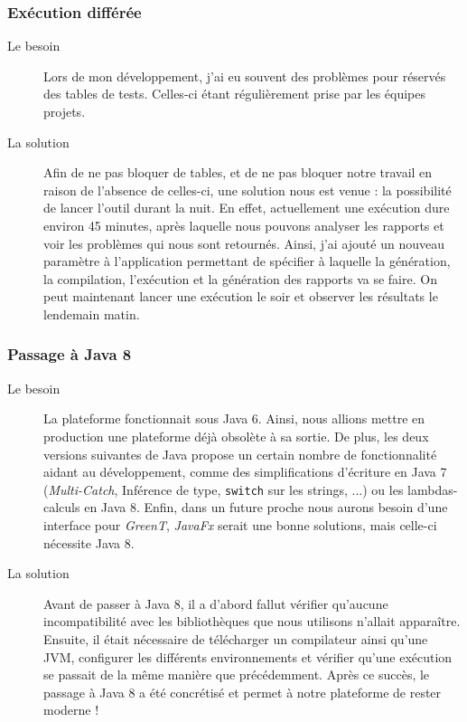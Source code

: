 	\subsubsection{Exécution différée} %
	\begin{description}
		\item[Le besoin] Lors de mon développement, j'ai eu souvent des problèmes pour réservés des tables de tests. Celles-ci étant régulièrement prise par les équipes projets. 
		\item[La solution] Afin de ne pas bloquer de tables, et de ne pas bloquer notre travail en raison de l'absence de celles-ci, une solution nous est venue : la possibilité de lancer l'outil durant la nuit. En effet, actuellement une exécution dure environ 45 minutes, après laquelle nous pouvons analyser les rapports et voir les problèmes qui nous sont retournés. Ainsi, j'ai ajouté un nouveau paramètre à l'application permettant de spécifier à laquelle la génération, la compilation, l'exécution et la génération des rapports va se faire. On peut maintenant lancer une exécution le soir et observer les résultats le lendemain matin.
	\end{description}
	
	\subsubsection{Passage à Java 8}
		\begin{description}
			\item[Le besoin] La plateforme fonctionnait sous Java 6. Ainsi, nous allions mettre en production une plateforme déjà obsolète à sa sortie. De plus, les deux versions suivantes de Java propose un certain nombre de fonctionnalité aidant au développement, comme des simplifications d'écriture en Java 7 (\textit{Multi-Catch}, Inférence de type, \texttt{switch} sur les strings, ...) ou les lambdas-calculs en Java 8. Enfin, dans un future proche nous aurons besoin d'une interface pour \textit{GreenT}, \textit{JavaFx} serait une bonne solutions, mais celle-ci nécessite Java 8.
			\item[La solution] Avant de passer à Java 8, il a d'abord fallut vérifier qu'aucune incompatibilité avec les bibliothèques que nous utilisons n'allait apparaître. Ensuite, il était nécessaire de télécharger un compilateur ainsi qu'une JVM, configurer les différents environnements et vérifier qu'une exécution se passait de la même manière que précédemment. Après ce succès, le passage à Java 8 a été concrétisé et permet à notre plateforme de rester moderne ! 
		\end{description}
		
